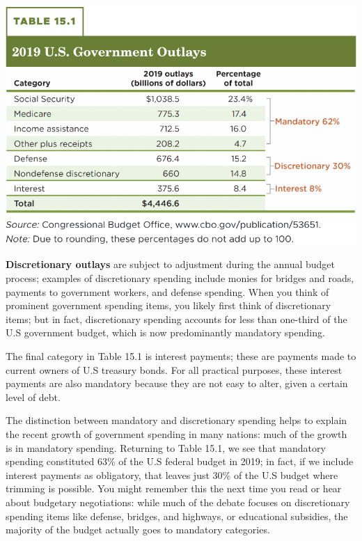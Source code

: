\documentclass[11pt]{article} %
\begin{document}
\begin{center}
\includegraphics[scale=0.5]{images/Table 15.1.png}
\end{center}
\textbf{Discretionary outlays} are subject to adjustment during the annual budget process; examples of discretionary spending include monies for bridges and roads, payments to government workers, and defense spending. When you think of prominent government spending items, you likely first think of discretionary items; but in fact, discretionary spending accounts for less than one-third of the U.S government budget, which is now predominantly mandatory spending.

The final category in Table 15.1 is interest payments; these are payments made to current owners of U.S treasury bonds. For all practical purposes, these interest payments are also mandatory because they are not easy to alter, given a certain level of debt.

The distinction between mandatory and discretionary spending helps to explain the recent growth of government spending in many nations: much of the growth is in mandatory spending. Returning to Table 15.1, we see that mandatory spending constituted 63\% of the U.S federal budget in 2019; in fact, if we include interest payments as obligatory, that leaves just 30\% of the U.S budget where trimming is possible. You might remember this the next time you read or hear about budgetary negotiations: while much of the debate focuses on discretionary spending items like defense, bridges, and highways, or educational subsidies, the majority of the budget actually goes to mandatory categories.
\end{document}
